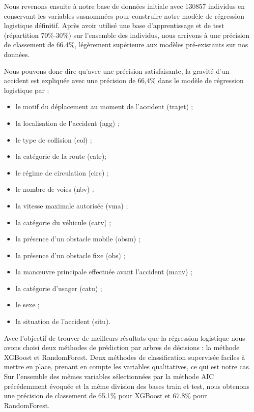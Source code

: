 \documentclass[french,]{tp}
\providecommand{\tightlist}{%
  \setlength{\itemsep}{0pt}\setlength{\parskip}{0pt}}
\begin{document}
Nous revenons ensuite à notre base de données initiale avec 130857 individus en conservant les variables susnommées pour construire notre modèle de régression logistique définitif. Après avoir utilisé une base d'apprentissage et de test (répartition 70\%-30\%) sur l'ensemble des individus, nous arrivons à une précision de classement de 66.4\%, légèrement supérieure aux modèles pré-existants sur nos données.

Nous pouvons donc dire qu'avec une précision satisfaisante, la gravité d'un accident est expliquée avec une précision de 66,4\% dans le modèle de régression logistique par :

\begin{itemize}
\tightlist
\item
  le motif du déplacement au moment de l'accident (trajet) ;\\
\item
  la localisation de l'accident (agg) ;\\
\item
  le type de collision (col) ;\\
\item
  la catégorie de la route (catr);\\
\item
  le régime de circulation (circ) ;\\
\item
  le nombre de voies (nbv) ;\\
\item
  la vitesse maximale autorisée (vma) ;\\
\item
  la catégorie du véhicule (catv) ;\\
\item
  la présence d'un obstacle mobile (obsm) ;\\
\item
  la présence d'un obstacle fixe (obs) ;\\
\item
  la manœuvre principale effectuée avant l'accident (manv) ;\\
\item
  la catégorie d'usager (catu) ;\\
\item
  le sexe ;\\
\item
  la situation de l'accident (situ).
\end{itemize}

Avec l'objectif de trouver de meilleurs résultats que la régression logistique nous avons choisi deux méthodes de prédiction par arbres de décisions : la méthode XGBoost et RandomForest. Deux méthodes de classification supervisée faciles à mettre en place, prenant en compte les variables qualitatives, ce qui est notre cas. Sur l'ensemble des mêmes variables sélectionnées par la méthode AIC précédemment évoquée et la même division des bases train et test, nous obtenons une précision de classement de 65.1\% pour XGBoost et 67.8\% pour RandomForest.
\end{document}
